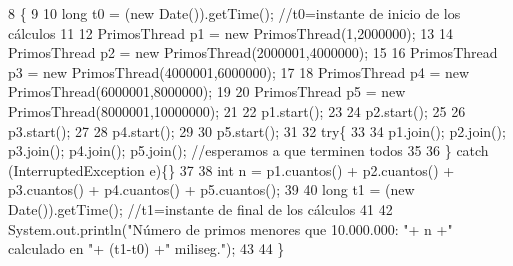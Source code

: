 \begin{DoxyCode}
8                                        \{
9 
10            \textcolor{keywordtype}{long} t0 = (\textcolor{keyword}{new} Date()).getTime(); \textcolor{comment}{//t0=instante de inicio de los cálculos}
11 
12            PrimosThread p1 = \textcolor{keyword}{new} PrimosThread(1,2000000);
13 
14            PrimosThread p2 = \textcolor{keyword}{new} PrimosThread(2000001,4000000);
15 
16            PrimosThread p3 = \textcolor{keyword}{new} PrimosThread(4000001,6000000);
17 
18            PrimosThread p4 = \textcolor{keyword}{new} PrimosThread(6000001,8000000);
19 
20            PrimosThread p5 = \textcolor{keyword}{new} PrimosThread(8000001,10000000);
21 
22            p1.start();
23 
24            p2.start();
25 
26            p3.start();
27 
28            p4.start();
29 
30            p5.start();
31 
32            \textcolor{keywordflow}{try}\{
33 
34             p1.join(); p2.join(); p3.join(); p4.join(); p5.join(); \textcolor{comment}{//esperamos a que terminen todos}
35 
36            \} \textcolor{keywordflow}{catch} (InterruptedException e)\{\}
37 
38            \textcolor{keywordtype}{int} n = p1.cuantos() + p2.cuantos() + p3.cuantos() + p4.cuantos() + p5.cuantos();
39 
40            \textcolor{keywordtype}{long} t1 = (\textcolor{keyword}{new} Date()).getTime(); \textcolor{comment}{//t1=instante de final de los cálculos}
41 
42            System.out.println(\textcolor{stringliteral}{"Número de primos menores que 10.000.000: "}+ n +\textcolor{stringliteral}{" calculado en "}+ (t1-t0) +\textcolor{stringliteral}{"
       miliseg."});
43 
44     \}
\end{DoxyCode}

